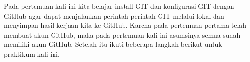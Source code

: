 \documentclass[a4paper]{tufte-handout}
\begin{document}
\begin{comment}
\vspace*{.5cm}
Setelah perkenalan, setiap mahasiswa membuat akun github dan akun discord sebagai media komunikasi dan tempat bekerja secara berkelompok. Hasil dari kegiatan tersebut dapat dilihat pada Tabel \ref{tab:peserta} dan Link Server Discord, yaitu \url{https://discord.gg/bJCNpaxv62}.

Tugas di pertemuan pertama adalah menyiapkan \textit{environment} untuk tempat kerja minimal sebagai berikut:
\begin{multicols}{2}
\begin{itemize}
\setlength\itemsep{0em}
\item Processor 2 GHz dual-core
\item RAM sebesar 4 GB
\item Harddisk kosong 25 GB
\item Resolusi layar 1024 x 768
\item \textit{Operating System}: Ubuntu 22.04 LTS
\end{itemize}
\end{multicols}
\hrulefill

\end{comment}
\clearpage


Pada pertemuan kali ini kita belajar install GIT dan konfigurasi GIT dengan GitHub agar dapat menjalankan perintah-perintah GIT melalui lokal dan menyimpan hasil kerjaan kita ke GitHub. Karena pada pertemuan pertama telah membuat akun GitHub, maka pada pertemuan kali ini asumsinya semua sudah memiliki akun GitHub. Setelah itu ikuti beberapa langkah berikut untuk praktikum kali ini.
\end{document}
